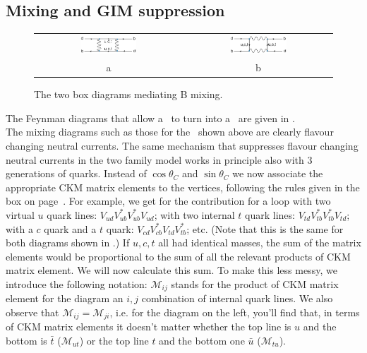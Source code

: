 \subsection{Mixing and GIM suppression}
\begin{figure}[!h]
\begin{tabular}{cc}
\includegraphics[width=0.4\textwidth]{fig/C_P_CP/BMix1}
&
\includegraphics[width=0.4\textwidth]{fig/C_P_CP/BMix2}
\\ a & b
\end{tabular}
\caption{The two box diagrams mediating B mixing.\label{fig:BMixingDiagrams}}
\end{figure}
The Feynman diagrams that allow a \Bo\ to turn into a \Bob\ are given in 
.\\
The mixing diagrams such as those for the \Bo\ shown above are clearly flavour changing neutral currents. The same mechanism that suppresses flavour changing neutral currents in the two family model works in principle also with 3 generations of quarks. Instead of $\cos\theta_C$ and $\sin\theta_C$ we now associate the appropriate CKM matrix elements to the vertices, following the rules given in the box on page~\pageref{box:CKMVertices}. For example, we get for the contribution for a loop with two virtual $u$ quark lines: $V_{ud} V_{ub}^* V_{ub}^* V_{ud}$; with two internal $t$ quark lines: $V_{td} V_{tb}^* V_{tb}^* V_{td}$; with a $c$ quark and a $t$ quark: 
$V_{cd} V_{cb}^* V_{td} V_{tb}^*$; etc.
(Note that this is the same for both diagrams shown in .) If $u, c, t$ all had identical masses, the sum of the matrix elements would be proportional to the sum of all the relevant products of CKM matrix element. We will now calculate this sum. To make this less messy, we introduce the following notation: $\mathcal{M}_{ij}$ stands for the product of CKM matrix element for the diagram an $i, j$ combination of internal quark lines. We also observe that $\mathcal{M}_{ij} = \mathcal{M}_{ji}$, i.e. for the diagram on the left, you'll find that, in terms of CKM matrix elements it doesn't matter whether the top line is $u$ and the bottom is $\bar{t}$ ($\mathcal{M}_{ut}$) or the top line $t$ and the bottom one $\bar{u}$ ($\mathcal{M}_{tu}$).
